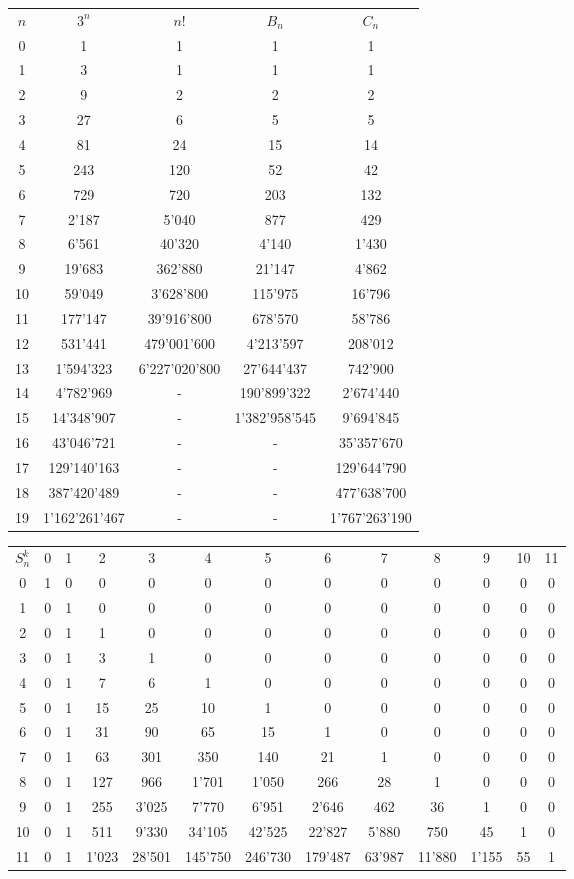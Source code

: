 \begin{center}
\begin{tabular}{ccccc}
$n$&$3^n$&$n!$&$B_{n}$&$C_{n}$\\
0&1&1&1&1\\
1&3&1&1&1\\
2&9&2&2&2\\
3&27&6&5&5\\
4&81&24&15&14\\
5&243&120&52&42\\
6&729&720&203&132\\
7&2'187&5'040&877&429\\
8&6'561&40'320&4'140&1'430\\
9&19'683&362'880&21'147&4'862\\
10&59'049&3'628'800&115'975&16'796\\
11&177'147&39'916'800&678'570&58'786\\
12&531'441&479'001'600&4'213'597&208'012\\
13&1'594'323&6'227'020'800&27'644'437&742'900\\
14&4'782'969&-&190'899'322&2'674'440\\
15&14'348'907&-&1'382'958'545&9'694'845\\
16&43'046'721&-&-&35'357'670\\
17&129'140'163&-&-&129'644'790\\
18&387'420'489&-&-&477'638'700\\
19&1'162'261'467&-&-&1'767'263'190\\
\end{tabular}
\end{center}

\begin{scriptsize}
\begin{center}
\setlength{\tabcolsep}{2pt}
\begin{tabular}{ccccccccccccc}
$S_n^k$&0&1&2&3&4&5&6&7&8&9&10&11\\
0&1&0&0&0&0&0&0&0&0&0&0&0\\
1&0&1&0&0&0&0&0&0&0&0&0&0\\
2&0&1&1&0&0&0&0&0&0&0&0&0\\
3&0&1&3&1&0&0&0&0&0&0&0&0\\
4&0&1&7&6&1&0&0&0&0&0&0&0\\
5&0&1&15&25&10&1&0&0&0&0&0&0\\
6&0&1&31&90&65&15&1&0&0&0&0&0\\
7&0&1&63&301&350&140&21&1&0&0&0&0\\
8&0&1&127&966&1'701&1'050&266&28&1&0&0&0\\
9&0&1&255&3'025&7'770&6'951&2'646&462&36&1&0&0\\
10&0&1&511&9'330&34'105&42'525&22'827&5'880&750&45&1&0\\
11&0&1&1'023&28'501&145'750&246'730&179'487&63'987&11'880&1'155&55&1\\
\end{tabular}
\end{center}
\end{scriptsize}

